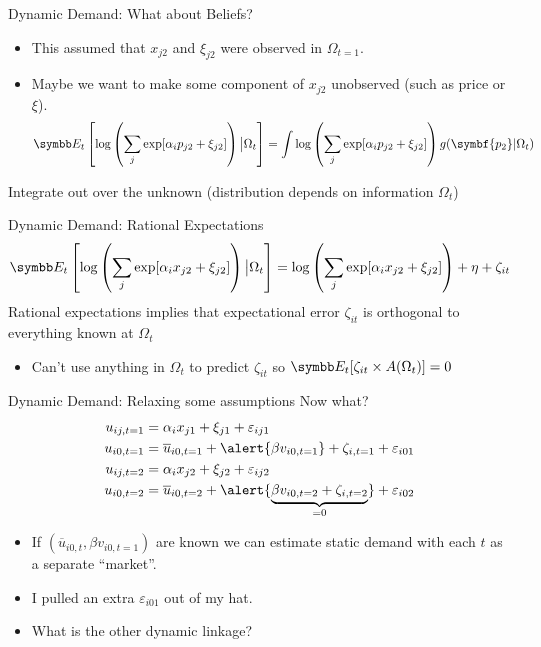 \documentclass[aspectratio=169,11pt]{beamer}
\begin{document}
\begin{frame}{Dynamic Demand: What about Beliefs?}
\begin{itemize}
\item This assumed that $x_{j2}$ and $\xi_{j2}$ were observed in $\Omega_{t=1}$.
\item Maybe we want to make some component of $x_{j2}$ \alert{unobserved} (such as price or $\xi$).
$$
\E_t\left[ \log \left( \sum_j \exp [ \alpha_i p_{j2}  +  \xi_{j2} ] \right)\big| \Omega_t\right]= 
\int \log \left( \sum_j \exp [ \alpha_i p_{j2}  +  \xi_{j2} ] \right)  g(\symbf{p_2} | \Omega_t) 
$$
\end{itemize}
Integrate out over the unknown (distribution depends on information $\Omega_t$)
\end{frame}

\begin{frame}{Dynamic Demand: Rational Expectations}
$$
\E_t\left[ \log \left( \sum_j \exp [ \alpha_i x_{j2}  +  \xi_{j2} ] \right)\big| \Omega_t\right]= 
\log \left( \sum_j \exp [ \alpha_i x_{j2}  +  \xi_{j2} ] \right)  + \eta+  \zeta_{it}
$$
Rational expectations implies that expectational error $\zeta_{it}$ is orthogonal to everything known at $\Omega_t$
\begin{itemize}
\item Can't use anything in $\Omega_t$ to predict $\zeta_{it}$ so $\E_t[\zeta_{it} \times A(\Omega_t)]=0$
\end{itemize}
\end{frame}

\begin{frame}{Dynamic Demand: Relaxing some assumptions}
Now what?
\begin{align*}
u_{ij,t=1} &=   \alpha_i x_{j1}  +  \xi_{j1} + \varepsilon_{ij1}\\
u_{i0,t=1} &=  \overline{u}_{i0,t=1}+  \alert{\beta v_{i0,t=1}} + \zeta_{i,t=1}+ \varepsilon_{i01} \\
u_{ij,t=2} &=   \alpha_i x_{j2}  +  \xi_{j2} + \varepsilon_{ij2}\\
u_{i0,t=2} &= \overline{u}_{i0,t=2} +  \alert{\underbrace{\beta v_{i0,t=2}+ \zeta_{i,t=2} }_{=0}}+\varepsilon_{i02} 
\end{align*}
\vspace{-.5cm}
\begin{itemize}
\item If $(\overline{u}_{i0,t}, \beta v_{i0,t=1})$ are known we can estimate static demand with each $t$ as a separate ``market''.
\item I pulled an extra $\varepsilon_{i01}$ out of my hat.
\item What is the other dynamic linkage?
\end{itemize}
\end{frame}
\end{document}
